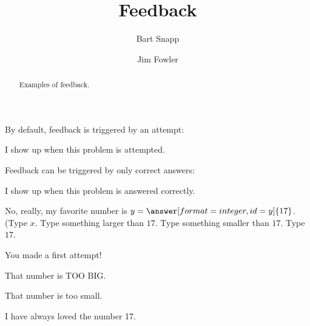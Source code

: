 \documentclass{ximera}
\title[Examples:]{Feedback}
\author{Bart Snapp \and Jim Fowler}
\begin{document}
\begin{abstract}
  Examples of feedback.
\end{abstract}
\maketitle

By default, feedback is triggered by an attempt:
\begin{exercise}
  \begin{multipleChoice}
  \end{multipleChoice}
  \begin{feedback}
    I show up when this problem is attempted. 
  \end{feedback}
\end{exercise}


Feedback can be triggered by only correct answers:
\begin{exercise}
  \begin{multipleChoice}
  \end{multipleChoice}
  \begin{feedback}[correct]
    I show up when this problem is answered correctly.
  \end{feedback}
\end{exercise}

\begin{problem}
  No, really, my favorite number is $y = \answer[format=integer,id=y]{17}$.
 (Type $x$. Type something larger than $17$. Type something smaller than $17$. Type $17$.
  \begin{feedback}[attempt]
    You made a first attempt!
  \end{feedback}

  \begin{feedback}[y>17]
    That number is TOO BIG.
  \end{feedback}

  \begin{feedback}[y<17]
    That number is too small.
  \end{feedback}

  \begin{feedback}[correct]
    I have always loved the number 17.
  \end{feedback}
\end{problem}
\end{document}
